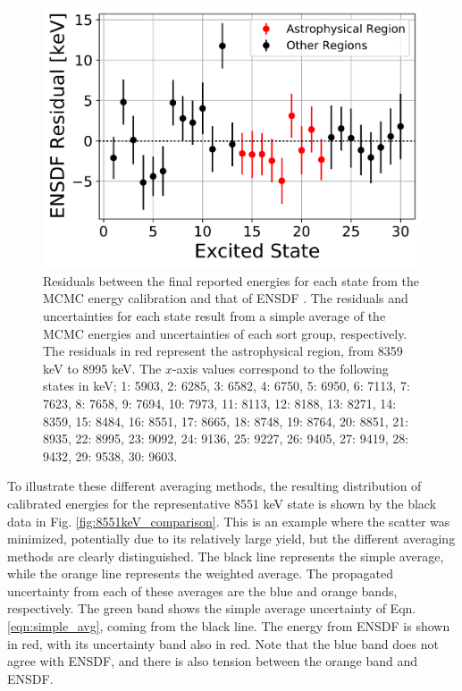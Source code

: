 \begin{figure}[!p]
\centering
\includegraphics[width=6.5in]{Chapter-6/figs/res.png}
\caption{\label{fig:residuals}Residuals between the final reported energies for each state from the MCMC energy calibration and that of ENSDF \cite{Chen2017}. The residuals and uncertainties for each state result from a simple average of the MCMC energies and uncertainties of each sort group, respectively. The residuals in red represent the astrophysical region, from 8359 keV to 8995 keV. The $x$-axis values correspond to the following states in keV; 1: 5903, 2: 6285, 3: 6582, 4: 6750, 5: 6950, 6: 7113, 7: 7623, 8: 7658, 9: 7694, 10: 7973, 11: 8113, 12: 8188, 13: 8271, 14: 8359, 15: 8484, 16: 8551, 17: 8665, 18: 8748, 19: 8764, 20: 8851, 21: 8935, 22: 8995, 23: 9092, 24: 9136, 25: 9227, 26: 9405, 27: 9419, 28: 9432, 29: 9538, 30: 9603.}
\end{figure}

To illustrate these different averaging methods, the resulting distribution of calibrated energies for the representative 8551 keV state is shown by the black data in Fig. \ref{fig:8551keV_comparison}. This is an example where the scatter was minimized, potentially due to its relatively large yield, but the different averaging methods are clearly distinguished. The black line represents the simple average, while the orange line represents the weighted average. The propagated uncertainty from each of these averages are the blue and orange bands, respectively. The green band shows the simple average uncertainty of Eqn. \ref{eqn:simple_avg}, coming from the black line. The energy from ENSDF is shown in red, with its uncertainty band also in red. Note that the blue band does not agree with ENSDF, and there is also tension between the orange band and ENSDF.

